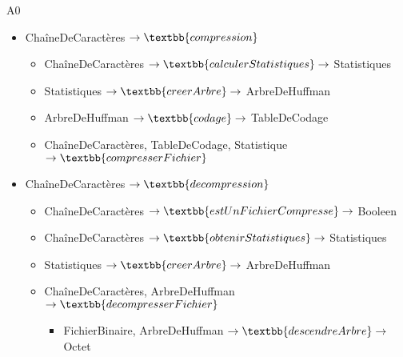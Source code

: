 A0 
\begin{itemize}
	\item ChaîneDeCaractères $\rightarrow\textbb{compression}$
    \begin{itemize}
		\item ChaîneDeCaractères $\rightarrow\textbb{calculerStatistiques}\rightarrow$ Statistiques
		\item Statistiques $\rightarrow\textbb{creerArbre}\rightarrow$ ArbreDeHuffman
		\item ArbreDeHuffman $\rightarrow\textbb{codage}\rightarrow$ TableDeCodage
		\item ChaîneDeCaractères, TableDeCodage, Statistique $\rightarrow\textbb{compresserFichier}$
    \end{itemize}
	\item ChaîneDeCaractères $\rightarrow\textbb{decompression}$ 
    \begin{itemize}
        \item ChaîneDeCaractères $\rightarrow\textbb{estUnFichierCompresse}\rightarrow$ Booleen
		\item ChaîneDeCaractères $\rightarrow\textbb{obtenirStatistiques}\rightarrow$ Statistiques
		\item Statistiques $\rightarrow\textbb{creerArbre}\rightarrow$ ArbreDeHuffman
		\item ChaîneDeCaractères, ArbreDeHuffman  $\rightarrow\textbb{decompresserFichier}$
        \begin{itemize}
            \item FichierBinaire, ArbreDeHuffman $\rightarrow\textbb{descendreArbre}\rightarrow$ Octet
        \end{itemize}
    \end{itemize}
\end{itemize}  
